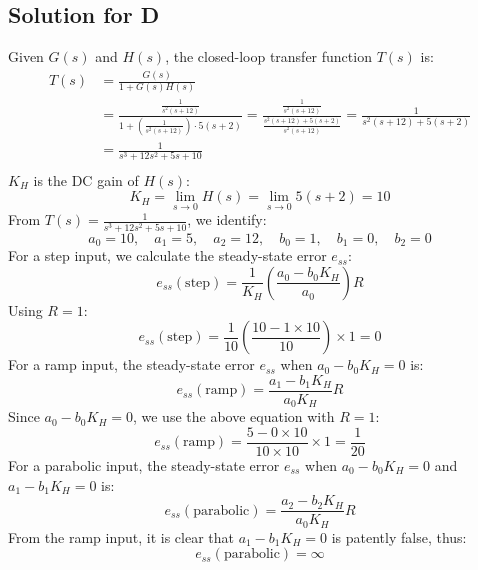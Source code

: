 \documentclass[11pt]{article}
\begin{document}
\subsection*{Solution for D}
Given \( G(s) \) and \( H(s) \), the closed-loop transfer function \( T(s) \) is:
\begin{align*}
T(s) &= \frac{G(s)}{1 + G(s)H(s)} \\
&= \frac{\frac{1}{s^2(s + 12)}}{1 + \left(\frac{1}{s^2(s + 12)}\right) \cdot 5(s + 2)} = \frac{\frac{1}{s^2(s + 12)}}{\frac{s^2(s + 12) + 5(s + 2)}{s^2(s + 12)}} = \frac{1}{s^2(s + 12) + 5(s + 2)} \\
&= \frac{1}{s^3 + 12s^2 + 5s + 10} \\
\end{align*}
\( K_H \) is the DC gain of \( H(s) \):
\[
K_H = \lim_{{s \to 0}} H(s) = \lim_{{s \to 0}} 5(s + 2) = 10
\]
From \( T(s) = \frac{1}{s^3 + 12s^2 + 5s + 10} \), we identify:
\[
a_0 = 10, \quad a_1 = 5, \quad a_2 = 12, \quad b_0 = 1, \quad b_1 = 0, \quad b_2 = 0
\]
For a step input, we calculate the steady-state error \( e_{ss} \):
\begin{equation*}
    e_{ss}(\text{step}) = \frac{1}{K_H} \left(\frac{a_0 - b_0K_H}{a_0}\right)R
\end{equation*}
Using \( R = 1 \):
\begin{equation*}
    e_{ss}(\text{step}) = \frac{1}{10} \left(\frac{10 - 1 \times 10}{10}\right) \times 1 = 0
\end{equation*}
For a ramp input, the steady-state error \( e_{ss} \) when \( a_0 - b_0K_H = 0 \) is:
\begin{equation*}
    e_{ss}(\text{ramp}) = \frac{a_1 - b_1K_H}{a_0K_H}R
\end{equation*}
Since \( a_0 - b_0K_H = 0 \), we use the above equation with \( R = 1 \):
\begin{equation*}
    e_{ss}(\text{ramp}) = \frac{5 - 0 \times 10}{10 \times 10} \times 1 = \frac{1}{20}
\end{equation*}
For a parabolic input, the steady-state error \( e_{ss} \) when \( a_0 - b_0K_H = 0 \) and \( a_1 - b_1K_H = 0 \) is:
\begin{equation*}
    e_{ss}(\text{parabolic}) = \frac{a_2 - b_2K_H}{a_0K_H}R
\end{equation*}
From the ramp input, it is clear that \( a_1 - b_1K_H = 0 \) is patently false, thus:
\begin{equation*}
    e_{ss}(\text{parabolic}) = \infty
\end{equation*}
\end{document}
